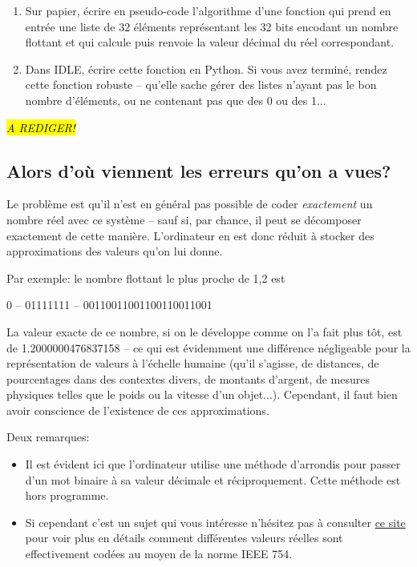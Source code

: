 \documentclass[12pt]{article}
\newenvironment{MaReponse}
		{\begin{greyedtextbox}\itshape} %
		{\end{greyedtextbox}}            %
\newenvironment{alphenum}
{\begin{enumerate}[label=\alph*.]}
	{\end{enumerate}}
\begin{document}
	\begin{MonExo}
		\begin{alphenum}
			\item Sur papier, écrire en pseudo-code l'algorithme d'une fonction qui prend en entrée une liste de 32 éléments représentant les 32 bits encodant un nombre flottant et qui calcule puis renvoie la valeur décimal du réel correspondant.
			\item Dans IDLE, écrire cette fonction en Python. Si vous avez terminé, rendez cette fonction robuste -- qu'elle sache gérer des listes n'ayant pas le bon nombre d'éléments, ou ne contenant pas que des 0 ou des 1...
		\end{alphenum}
	\end{MonExo}
	\begin{MaReponse}
		\hl{A REDIGER!}
	\end{MaReponse}
	
	\subsection{Alors d'où viennent les erreurs qu'on a vues?}
	Le problème est qu'il n'est en général pas possible de coder \textit{exactement} un nombre réel avec ce système -- sauf si, par chance, il peut se décomposer exactement de cette manière. L'ordinateur en est donc réduit à stocker des approximations des valeurs qu'on lui donne.
	
	Par exemple: le nombre flottant le plus proche de 1,2 est
	\begin{center}
		0 -- 01111111 -- 00110011001100110011001
	\end{center}
	La valeur exacte de ce nombre, si on le développe comme on l'a fait plus tôt, est de 1.2000000476837158 -- ce qui est évidemment une différence négligeable pour la représentation de valeurs à l'échelle humaine (qu'il s'agisse, de distances, de pourcentages dans des contextes divers, de montants d'argent, de mesures physiques telles que le poids ou la vitesse d'un objet...). Cependant, il faut bien avoir conscience de l'existence de ces approximations.
	
	Deux remarques:
	\begin{itemize}
		\item Il est évident ici que l'ordinateur utilise une méthode d'arrondis pour passer d'un mot binaire à sa valeur décimale et réciproquement. Cette méthode est hors programme.
		\item Si cependant c'est un sujet qui vous intéresse n'hésitez pas à consulter  \href{https://www.h-schmidt.net/FloatConverter/IEEE754.html}{ce site} pour voir plus en détails comment différentes valeurs réelles sont effectivement codées au moyen de la norme IEEE 754.
	\end{itemize}
	
\end{document}
